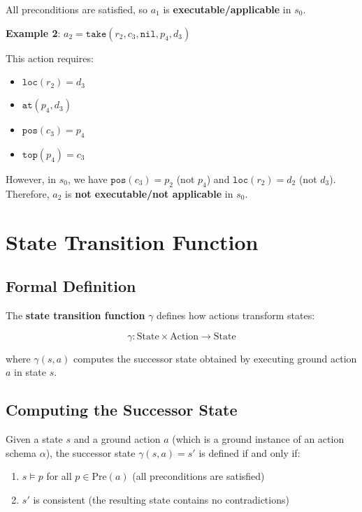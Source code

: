 \documentclass[11pt,a4paper]{article}
\theoremstyle{definition}
\theoremstyle{plain}
\theoremstyle{remark}
\begin{document}
All preconditions are satisfied, so $a_1$ is \textbf{executable/applicable} in $s_0$.

\textbf{Example 2}: $a_2 = \texttt{take}(r_2, c_3, \texttt{nil}, p_4, d_3)$

This action requires:
\begin{itemize}
    \item $\texttt{loc}(r_2) = d_3$
    \item $\texttt{at}(p_4, d_3)$
    \item $\texttt{pos}(c_3) = p_4$
    \item $\texttt{top}(p_4) = c_3$
\end{itemize}

However, in $s_0$, we have $\texttt{pos}(c_3) = p_2$ (not $p_4$) and $\texttt{loc}(r_2) = d_2$ (not $d_3$). Therefore, $a_2$ is \textbf{not executable/not applicable} in $s_0$.

\section{State Transition Function}

\subsection{Formal Definition}

The \textbf{state transition function} $\gamma$ defines how actions transform states:

\[
\gamma: \text{State} \times \text{Action} \rightarrow \text{State}
\]

where $\gamma(s, a)$ computes the successor state obtained by executing ground action $a$ in state $s$.

\subsection{Computing the Successor State}

Given a state $s$ and a ground action $a$ (which is a ground instance of an action schema $\alpha$), the successor state $\gamma(s, a) = s'$ is defined if and only if:

\begin{enumerate}
    \item $s \models p$ for all $p \in \text{Pre}(a)$ (all preconditions are satisfied)
    \item $s'$ is consistent (the resulting state contains no contradictions)
\end{enumerate}
\end{document}
